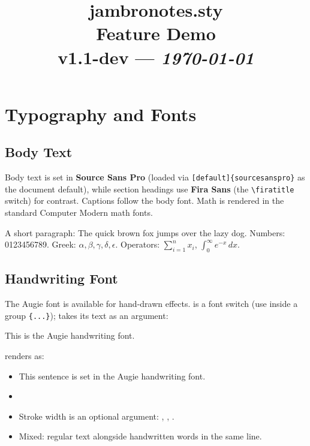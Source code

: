 \documentclass[11pt,a4paper]{article}
\title{\vspace{-2cm}\color{title}
\huge\textbf{jambronotes.sty}\\[0.3em]
\Large Feature Demo\\[0.3em]
\large v1.1-dev --- \textit{\today}
}
\author{}
\date{}
\begin{document}
\maketitle
\tableofcontents
\clearpage
\listofboxes
\clearpage

\section{Typography and Fonts}

\subsection{Body Text}

Body text is set in \textbf{Source Sans Pro} (loaded via \verb|[default]{sourcesanspro}| as the document default), while section headings use \textbf{Fira Sans} (the \verb|\firatitle| switch) for contrast. Captions follow the body font. Math is rendered in the standard Computer Modern math fonts.

A short paragraph: The quick brown fox jumps over the lazy dog. Numbers: 0123456789. Greek: $\alpha, \beta, \gamma, \delta, \epsilon$. Operators: $\sum_{i=1}^{n} x_i$, $\int_0^\infty e^{-x}\,dx$.

\subsection{Handwriting Font}

The Augie font is available for hand-drawn effects. \texttt{\string\hand} is a font switch (use inside a group \verb|{...}|); \texttt{\string\handbold} takes its text as an argument:

\begin{democode}
{\hand This is the Augie handwriting font.}
\end{democode}

\noindent renders as:

\begin{itemize}
    \item {\hand This sentence is set in the Augie handwriting font.}
    \item {}
    \item Stroke width is an optional argument: , , .
    \item Mixed: regular text alongside {\hand handwritten words} in the same line.
\end{itemize}
\end{document}

